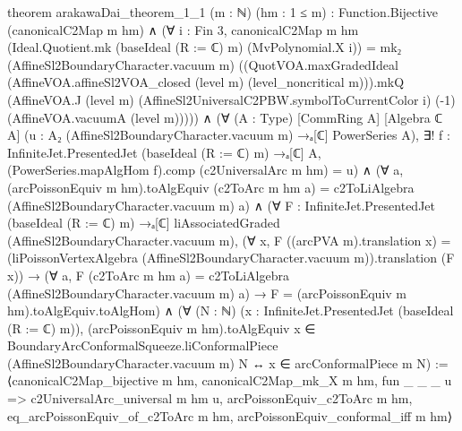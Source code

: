 \begin{leancode}
theorem arakawaDai_theorem_1_1 (m : ℕ) (hm : 1 ≤ m) :
    Function.Bijective (canonicalC2Map m hm) ∧
    (∀ i : Fin 3,
      canonicalC2Map m hm (Ideal.Quotient.mk (baseIdeal (R := ℂ) m) (MvPolynomial.X i)) =
        mk₂ (AffineSl2BoundaryCharacter.vacuum m)
          ((QuotVOA.maxGradedIdeal (AffineVOA.affineSl2VOA_closed (level m)
            (level_noncritical m))).mkQ
            (AffineVOA.J (level m) (AffineSl2UniversalC2PBW.symbolToCurrentColor i) (-1)
              (AffineVOA.vacuumA (level m))))) ∧
    (∀ (A : Type) [CommRing A] [Algebra ℂ A]
        (u : A₂ (AffineSl2BoundaryCharacter.vacuum m) →ₐ[ℂ] PowerSeries A),
      ∃! f : InfiniteJet.PresentedJet (baseIdeal (R := ℂ) m) →ₐ[ℂ] A,
        (PowerSeries.mapAlgHom f).comp (c2UniversalArc m hm) = u) ∧
    (∀ a, (arcPoissonEquiv m hm).toAlgEquiv (c2ToArc m hm a) =
      c2ToLiAlgebra (AffineSl2BoundaryCharacter.vacuum m) a) ∧
    (∀ F : InfiniteJet.PresentedJet (baseIdeal (R := ℂ) m) →ₐ[ℂ]
        liAssociatedGraded (AffineSl2BoundaryCharacter.vacuum m),
      (∀ x, F ((arcPVA m).translation x) =
        (liPoissonVertexAlgebra (AffineSl2BoundaryCharacter.vacuum m)).translation (F x)) →
      (∀ a, F (c2ToArc m hm a) = c2ToLiAlgebra (AffineSl2BoundaryCharacter.vacuum m) a) →
      F = (arcPoissonEquiv m hm).toAlgEquiv.toAlgHom) ∧
    (∀ (N : ℕ) (x : InfiniteJet.PresentedJet (baseIdeal (R := ℂ) m)),
      (arcPoissonEquiv m hm).toAlgEquiv x ∈
        BoundaryArcConformalSqueeze.liConformalPiece (AffineSl2BoundaryCharacter.vacuum m) N ↔
        x ∈ arcConformalPiece m N) :=
  ⟨canonicalC2Map_bijective m hm, canonicalC2Map_mk_X m hm,
    fun _ _ _ u => c2UniversalArc_universal m hm u, arcPoissonEquiv_c2ToArc m hm,
    eq_arcPoissonEquiv_of_c2ToArc m hm, arcPoissonEquiv_conformal_iff m hm⟩
\end{leancode}

